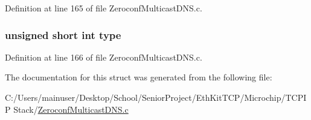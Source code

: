 Definition at line 165 of file Zeroconf\+Multicast\+D\+N\+S.\+c.

\hypertarget{structquestion_ae012f1e07e75a1182514bffdefaca17a}{}
\subsubsection[{type}]{\setlength{\rightskip}{0pt plus 5cm}unsigned short int type}\label{structquestion_ae012f1e07e75a1182514bffdefaca17a}


Definition at line 166 of file Zeroconf\+Multicast\+D\+N\+S.\+c.



The documentation for this struct was generated from the following file\+:\begin{DoxyCompactItemize}
\item 
C\+:/\+Users/mainuser/\+Desktop/\+School/\+Senior\+Project/\+Eth\+Kit\+T\+C\+P/\+Microchip/\+T\+C\+P\+I\+P Stack/\hyperlink{_zeroconf_multicast_d_n_s_8c}{Zeroconf\+Multicast\+D\+N\+S.\+c}\end{DoxyCompactItemize}
